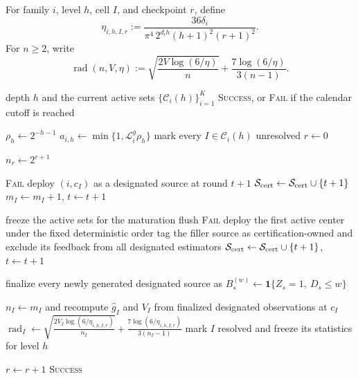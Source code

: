 
\newcommand{\VSrad}[3]{%
  \sqrt{\frac{2#2\log(6/#3)}{#1}}
  +\frac{7\log(6/#3)}{3(#1-1)}%
}

For family $i$, level $h$, cell $I$, and checkpoint $r$, define
\[
\eta_{i,h,I,r}
:=
\frac{36\delta_i}
{\pi^4\,2^{d_i h}(h+1)^2(r+1)^2}.
\]
For $n\ge2$, write
\[
\operatorname{rad}(n,V,\eta)
:=
\sqrt{\frac{2V\log(6/\eta)}{n}}
+
\frac{7\log(6/\eta)}{3(n-1)}.
\]

\begin{algorithm}[t]
\caption{Resolve one dyadic level}
\label{alg:vs-resolve-level}
\small
\begin{algorithmic}[1]
\Require depth $h$ and the current active sets $\{\mathcal C_i(h)\}_{i=1}^K$
\Ensure \textsc{Success}, or \textsc{Fail} if the calendar cutoff is reached

\State $\rho_h\gets2^{-h-1}$
    \State $a_{i,h}\gets\min\{1,\mathcal L_i^g\rho_h\}$
    \State mark every $I\in\mathcal C_i(h)$ unresolved
\EndFor
\State $r\gets0$

    \State $n_r\gets2^{r+1}$ 

                \State \Return \textsc{Fail}
            \EndIf
            \State deploy $(i,c_I)$ as a designated source at round $t+1$
            \State $\mathcal S_{\rm cert}\gets
            \mathcal S_{\rm cert}\cup\{t+1\}$
            \State $m_I\gets m_I+1$, $t\gets t+1$
        \EndWhile
    \EndFor

    \State freeze the active sets for the maturation flush
            \State \Return \textsc{Fail}
        \EndIf
        \State deploy the first active center under the fixed deterministic order
        \State tag the filler source as certification-owned and exclude its feedback
        from all designated estimators
        \State $\mathcal S_{\rm cert}\gets
        \mathcal S_{\rm cert}\cup\{t+1\}$, $t\gets t+1$
    \EndFor

    \State finalize every newly generated designated source as
    $B_s^{(w)}\gets\mathbf 1\{Z_s=1,\ D_s\le w\}$

        \State $n_I\gets m_I$ and recompute $\widehat g_I$ and $V_I$
        from finalized designated observations at $c_I$
        \State $\operatorname{rad}_I\gets
        \VSrad{n_I}{V_I}{\eta_{i,h,I,r}}$
            \State mark $I$ resolved and freeze its statistics for level $h$
        \EndIf
    \EndFor

    \State $r\gets r+1$
\EndWhile
\State \Return \textsc{Success}
\end{algorithmic}
\end{algorithm}

